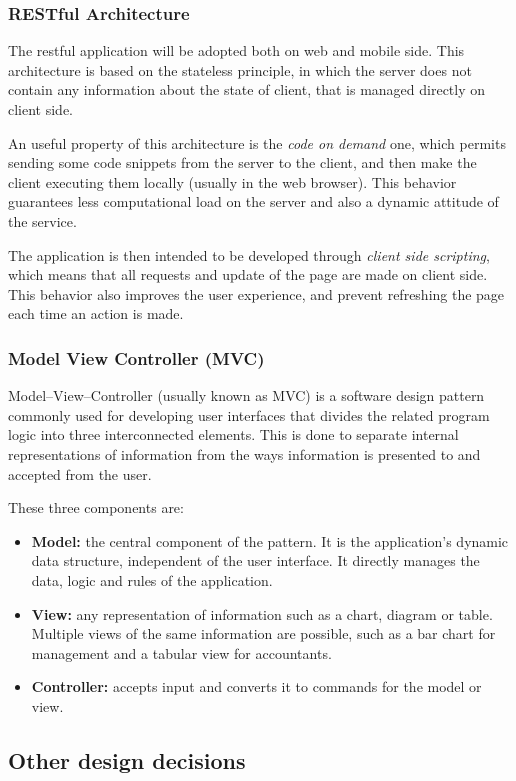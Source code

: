 \subsubsection{RESTful Architecture}
\label{REST}
The restful application will be adopted both on web and mobile side. This architecture is based on the stateless principle, in which the server does not contain any information about the state of client, that is managed directly on client side.

An useful property of this architecture is the \textit{code on demand} one, which permits sending some code snippets from the server to the client, and then make the client executing them locally (usually in the web browser). This behavior guarantees less computational load on the server and also a dynamic attitude of the service.

The application is then intended to be developed through \textit{client side scripting}, which means that all requests and update of the page are made on client side. This behavior also improves the user experience, and prevent refreshing the page each time an action is made.

\subsubsection{Model View Controller (MVC)}
Model--View--Controller (usually known as MVC) is a software design pattern commonly used for developing user interfaces that divides the related program logic into three interconnected elements. This is done to separate internal representations of information from the ways information is presented to and accepted from the user.

These three components are:
\begin{itemize}
    \item \textbf{Model:} the central component of the pattern. It is the application's dynamic data structure, independent of the user interface. It directly manages the data, logic and rules of the application.
    \item \textbf{View:} any representation of information such as a chart, diagram or table. Multiple views of the same information are possible, such as a bar chart for management and a tabular view for accountants.
    \item \textbf{Controller:} accepts input and converts it to commands for the model or view.
\end{itemize}

\subsection{Other design decisions}
